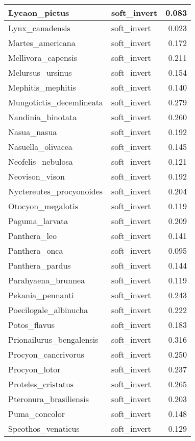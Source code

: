 \begin{table}
\begin{tabular}[t]{l|l|r}
\hline
Lycaon\_pictus & soft\_invert & 0.083\\
\hline
Lynx\_canadensis & soft\_invert & 0.023\\
\hline
Martes\_americana & soft\_invert & 0.172\\
\hline
Mellivora\_capensis & soft\_invert & 0.211\\
\hline
Melursus\_ursinus & soft\_invert & 0.154\\
\hline
Mephitis\_mephitis & soft\_invert & 0.140\\
\hline
Mungotictis\_decemlineata & soft\_invert & 0.279\\
\hline
Nandinia\_binotata & soft\_invert & 0.260\\
\hline
Nasua\_nasua & soft\_invert & 0.192\\
\hline
Nasuella\_olivacea & soft\_invert & 0.145\\
\hline
Neofelis\_nebulosa & soft\_invert & 0.121\\
\hline
Neovison\_vison & soft\_invert & 0.192\\
\hline
Nyctereutes\_procyonoides & soft\_invert & 0.204\\
\hline
Otocyon\_megalotis & soft\_invert & 0.119\\
\hline
Paguma\_larvata & soft\_invert & 0.209\\
\hline
Panthera\_leo & soft\_invert & 0.141\\
\hline
Panthera\_onca & soft\_invert & 0.095\\
\hline
Panthera\_pardus & soft\_invert & 0.144\\
\hline
Parahyaena\_brunnea & soft\_invert & 0.119\\
\hline
Pekania\_pennanti & soft\_invert & 0.243\\
\hline
Poecilogale\_albinucha & soft\_invert & 0.222\\
\hline
Potos\_flavus & soft\_invert & 0.183\\
\hline
Prionailurus\_bengalensis & soft\_invert & 0.316\\
\hline
Procyon\_cancrivorus & soft\_invert & 0.250\\
\hline
Procyon\_lotor & soft\_invert & 0.237\\
\hline
Proteles\_cristatus & soft\_invert & 0.265\\
\hline
Pteronura\_brasiliensis & soft\_invert & 0.203\\
\hline
Puma\_concolor & soft\_invert & 0.148\\
\hline
Speothos\_venaticus & soft\_invert & 0.129\\

\end{tabular}
\end{table}
